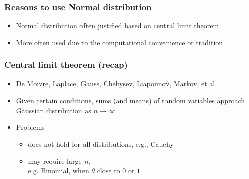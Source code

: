 \documentclass[10pt]{beamer}
\begin{document}
\begin{frame}

  \frametitle{Reasons to use Normal distribution}

  \begin{itemize}
  \item Normal distribution often justified based on central limit theorem
  \item More often used due to the computational convenience or tradition
  \end{itemize}

\end{frame}


\begin{frame}

  \frametitle{Central limit theorem (recap)}

  \begin{itemize}
  \item De Moivre, Laplace, Gauss, Chebysev, Liapounov, Markov, et al.
  \item Given certain conditions, sums (and means) of random variables
    approach Gaussian distribution as $n \rightarrow \infty$
  \item Problems
    \begin{itemize}
    \item does not hold for all distributions, e.g., Cauchy
    \item may require large $n$,\\ e.g.
      Binomial, when $\theta$ close to $0$ or $1$
    \end{itemize}
  \end{itemize}

\end{frame}
\end{document}
